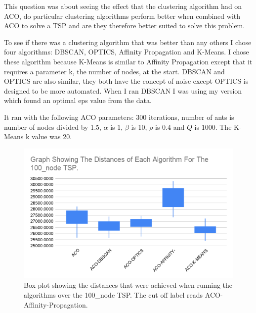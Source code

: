 This question was about seeing the effect that the clustering algorithm had on ACO, do particular clustering algorithms perform better when combined with ACO to solve a TSP and are they therefore better suited to solve this problem.

To see if there was a clustering algorithm that was better than any others I chose four algorithms: DBSCAN, OPTICS, Affinity Propagation and K-Means. I chose these algorithm because K-Means is similar to Affinity Propagation except that it requires a parameter k, the number of nodes, at the start. DBSCAN and OPTICS are also similar, they both have the concept of noise except OPTICS is designed to be more automated. When I ran DBSCAN I was using my version which found an optimal eps value from the data. 

It ran with the following ACO parameters: 300 iterations, number of ants is number of nodes divided by 1.5, $\alpha$ is 1, $\beta$ is 10, $\rho$ is 0.4 and $Q$ is 1000. The K-Means k value was 20.

\begin{figure}
    \centering
    \includegraphics[width=\textwidth]{figures/distance_100_node_graph.png}
    \caption{Box plot showing the distances that were achieved when running the algorithms over the 100\_node TSP. The cut off label reads ACO-Affinity-Propagation.}
    \label{fig:distance_100_node}
\end{figure}

